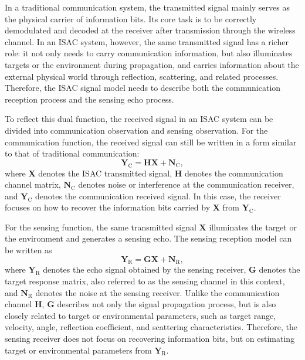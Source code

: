 In a traditional communication system,
the transmitted signal mainly serves as the physical carrier of information bits.
Its core task is to be correctly demodulated and decoded at the receiver
after transmission through the wireless channel.
In an ISAC system,
however,
the same transmitted signal has a richer role:
it not only needs to carry communication information,
but also illuminates targets or the environment during propagation,
and carries information about the external physical world through reflection,
scattering,
and related processes.
Therefore,
the ISAC signal model needs to describe both the communication reception process
and the sensing echo process.

To reflect this dual function,
the received signal in an ISAC system can be divided into communication observation
and sensing observation.
For the communication function,
the received signal can still be written in a form similar to that of traditional communication:
\begin{equation}
    \mathbf{Y}_{\mathrm{C}}
    =
    \mathbf{H}\mathbf{X}
    +
    \mathbf{N}_{\mathrm{C}},
    \label{eq:isac_communication_model}
\end{equation}
where \(\mathbf{X}\) denotes the ISAC transmitted signal,
\(\mathbf{H}\) denotes the communication channel matrix,
\(\mathbf{N}_{\mathrm{C}}\) denotes noise or interference at the communication receiver,
and \(\mathbf{Y}_{\mathrm{C}}\) denotes the communication received signal.
In this case,
the receiver focuses on how to recover the information bits carried by \(\mathbf{X}\)
from \(\mathbf{Y}_{\mathrm{C}}\).

For the sensing function,
the same transmitted signal \(\mathbf{X}\) illuminates the target or the environment
and generates a sensing echo.
The sensing reception model can be written as
\begin{equation}
    \mathbf{Y}_{\mathrm{R}}
    =
    \mathbf{G}\mathbf{X}
    +
    \mathbf{N}_{\mathrm{R}},
    \label{eq:isac_sensing_model}
\end{equation}
where \(\mathbf{Y}_{\mathrm{R}}\) denotes the echo signal obtained by the sensing receiver,
\(\mathbf{G}\) denotes the target response matrix,
also referred to as the sensing channel in this context,
and \(\mathbf{N}_{\mathrm{R}}\) denotes the noise at the sensing receiver.
Unlike the communication channel \(\mathbf{H}\),
\(\mathbf{G}\) describes not only the signal propagation process,
but is also closely related to target or environmental parameters,
such as target range,
velocity,
angle,
reflection coefficient,
and scattering characteristics.
Therefore,
the sensing receiver does not focus on recovering information bits,
but on estimating target or environmental parameters from \(\mathbf{Y}_{\mathrm{R}}\).

